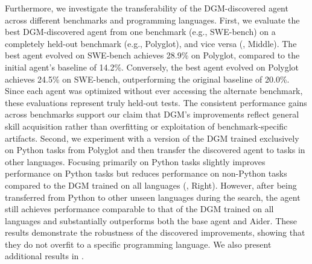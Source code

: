Furthermore, we investigate the transferability of the DGM-discovered agent across different benchmarks and programming languages. First, we evaluate the best DGM-discovered agent from one benchmark (e.g., SWE-bench) on a completely held-out benchmark (e.g., Polyglot), and vice versa (, Middle). The best agent evolved on SWE-bench achieves 28.9\% on Polyglot, compared to the initial agent's baseline of 14.2\%. Conversely, the best agent evolved on Polyglot achieves 24.5\% on SWE-bench, outperforming the original baseline of 20.0\%. Since each agent was optimized without ever accessing the alternate benchmark, these evaluations represent truly held-out tests. The consistent performance gains across benchmarks support our claim that DGM's improvements reflect general skill acquisition rather than overfitting or exploitation of benchmark-specific artifacts. Second, we experiment with a version of the DGM trained exclusively on Python tasks from Polyglot and then transfer the discovered agent to tasks in other languages. Focusing primarily on Python tasks slightly improves performance on Python tasks but reduces performance on non-Python tasks compared to the DGM trained on all languages (, Right). However, after being transferred from Python to other unseen languages during the search, the agent still achieves performance comparable to that of the DGM trained on all languages and substantially outperforms both the base agent and Aider. These results demonstrate the robustness of the discovered improvements, showing that they do not overfit to a specific programming language. We also present additional results in .


